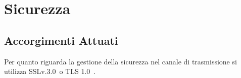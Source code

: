 \section{Sicurezza}
\subsection{Accorgimenti Attuati}
Per quanto riguarda la gestione della sicurezza nel canale di trasmissione
si utilizza SSLv.3.0\glo\ o TLS 1.0\glo\ .
